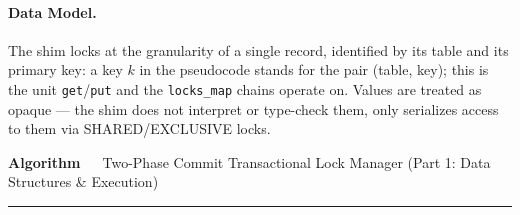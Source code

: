 \documentclass{article}
\begin{document}
\paragraph{Data Model.}
The shim locks at the granularity of a single record, identified by its table and its primary key: a key $k$ in the pseudocode stands for the pair (table, key); this is the unit \texttt{get}/\texttt{put} and the \texttt{locks\_map} chains operate on. Values are treated as opaque --- the shim does not interpret or type-check them, only serializes access to them via SHARED/EXCLUSIVE locks.
\newpage
\vspace{1em}

\begingroup
{}
\noindent\textbf{Algorithm~\thealgorithm}\ \ Two-Phase Commit Transactional Lock Manager (Part 1: Data Structures \& Execution)\par\nopagebreak\vspace{2pt}\hrule\vspace{2pt}
\small
\end{document}
